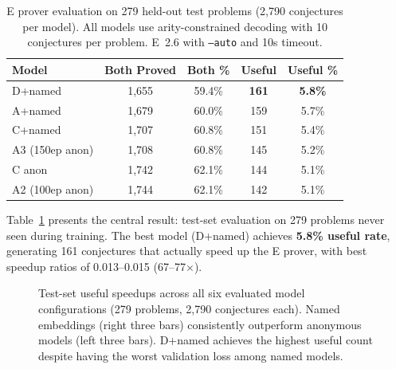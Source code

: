 \documentclass{article}
\begin{document}
\begin{table}[t]
\centering
\caption{E prover evaluation on 279 held-out test problems (2,790 conjectures per
model). All models use arity-constrained decoding with 10 conjectures per problem.
E~2.6 with \texttt{--auto} and 10s timeout.}
\label{tab:test}
\begin{tabular}{lcccc}
\toprule
\textbf{Model} & \textbf{Both Proved} & \textbf{Both \%} & \textbf{Useful} & \textbf{Useful \%} \\
\midrule
D+named       & 1,655 & 59.4\% & \textbf{161} & \textbf{5.8\%} \\
A+named       & 1,679 & 60.0\% & 159 & 5.7\% \\
C+named       & 1,707 & 60.8\% & 151 & 5.4\% \\
A3 (150ep anon) & 1,708 & 60.8\% & 145 & 5.2\% \\
C anon        & 1,742 & 62.1\% & 144 & 5.1\% \\
A2 (100ep anon) & 1,744 & 62.1\% & 142 & 5.1\% \\
\bottomrule
\end{tabular}
\end{table}

Table~\ref{tab:test} presents the central result: test-set evaluation on 279 problems
never seen during training. The best model (D+named) achieves \textbf{5.8\% useful
rate}, generating 161 conjectures that actually speed up the E prover, with best
speedup ratios of 0.013--0.015 (67--77$\times$).

\begin{figure}[t]
\centering
{}
\caption{Test-set useful speedups across all six evaluated model configurations
(279 problems, 2,790 conjectures each). Named embeddings (right three bars)
consistently outperform anonymous models (left three bars). D+named achieves
the highest useful count despite having the worst validation loss among named models.}
\label{fig:useful_comparison}
\end{figure}
\end{document}
